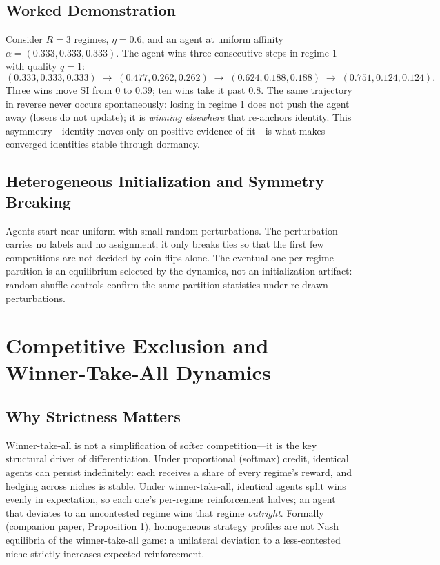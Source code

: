 \documentclass[11pt]{article}
\begin{document}
\subsection{Worked Demonstration}

Consider $R=3$ regimes, $\eta = 0.6$, and an agent at uniform affinity
$\alpha = (0.333, 0.333, 0.333)$. The agent wins three consecutive steps in
regime $1$ with quality $q = 1$:
\[
(0.333,0.333,0.333) \;\to\; (0.477,0.262,0.262) \;\to\; (0.624,0.188,0.188)
\;\to\; (0.751,0.124,0.124).
\]
Three wins move SI from $0$ to $0.39$; ten wins take it past $0.8$. The same
trajectory in reverse never occurs spontaneously: losing in regime 1 does not
push the agent away (losers do not update); it is \emph{winning elsewhere} that
re-anchors identity. This asymmetry---identity moves only on positive evidence
of fit---is what makes converged identities stable through dormancy.

\subsection{Heterogeneous Initialization and Symmetry Breaking}

Agents start near-uniform with small random perturbations. The perturbation
carries no labels and no assignment; it only breaks ties so that the first few
competitions are not decided by coin flips alone. The eventual one-per-regime
partition is an equilibrium selected by the dynamics, not an initialization
artifact: random-shuffle controls confirm the same partition statistics under
re-drawn perturbations.

\section{Competitive Exclusion and Winner-Take-All Dynamics}

\subsection{Why Strictness Matters}

Winner-take-all is not a simplification of softer competition---it is the key
structural driver of differentiation. Under proportional (softmax) credit,
identical agents can persist indefinitely: each receives a share of every
regime's reward, and hedging across niches is stable. Under winner-take-all,
identical agents split wins evenly in expectation, so each one's per-regime
reinforcement halves; an agent that deviates to an uncontested regime wins that
regime \emph{outright}. Formally (companion paper, Proposition 1), homogeneous
strategy profiles are not Nash equilibria of the winner-take-all game: a
unilateral deviation to a less-contested niche strictly increases expected
reinforcement.
\end{document}
